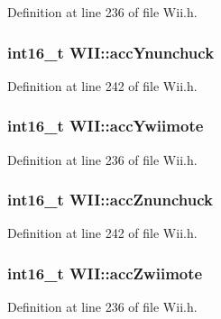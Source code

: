 \-Definition at line 236 of file \-Wii.\-h.

\hypertarget{class_w_i_i_ae657585a560e9d214e6c0219f8b47aeb}{
\subsubsection[{acc\-Ynunchuck}]{\setlength{\rightskip}{0pt plus 5cm}int16\-\_\-t {\bf \-W\-I\-I\-::acc\-Ynunchuck}}}\label{class_w_i_i_ae657585a560e9d214e6c0219f8b47aeb}


\-Definition at line 242 of file \-Wii.\-h.

\hypertarget{class_w_i_i_aa2c14275d9e482e6add06cb34ccf1197}{
\subsubsection[{acc\-Ywiimote}]{\setlength{\rightskip}{0pt plus 5cm}int16\-\_\-t {\bf \-W\-I\-I\-::acc\-Ywiimote}}}\label{class_w_i_i_aa2c14275d9e482e6add06cb34ccf1197}


\-Definition at line 236 of file \-Wii.\-h.

\hypertarget{class_w_i_i_a42af5743d2e3c2dbc01ea0b5531cc7c6}{
\subsubsection[{acc\-Znunchuck}]{\setlength{\rightskip}{0pt plus 5cm}int16\-\_\-t {\bf \-W\-I\-I\-::acc\-Znunchuck}}}\label{class_w_i_i_a42af5743d2e3c2dbc01ea0b5531cc7c6}


\-Definition at line 242 of file \-Wii.\-h.

\hypertarget{class_w_i_i_acdebdaab544ffcecf8ab09adacbd28c8}{
\subsubsection[{acc\-Zwiimote}]{\setlength{\rightskip}{0pt plus 5cm}int16\-\_\-t {\bf \-W\-I\-I\-::acc\-Zwiimote}}}\label{class_w_i_i_acdebdaab544ffcecf8ab09adacbd28c8}


\-Definition at line 236 of file \-Wii.\-h.

